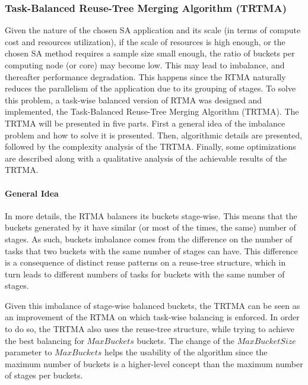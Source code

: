 



\subsubsection{Task-Balanced Reuse-Tree Merging Algorithm (TRTMA)}
\label{sec:TRTMA}

Given the nature of the chosen SA application and its scale (in terms of compute cost and resources utilization), if the scale of resources is high enough, or the chosen SA method requires a sample size small enough, the ratio of buckets per computing node (or core) may become low. This may lead to imbalance, and thereafter performance degradation. This happens since the RTMA naturally reduces the parallelism of the application due to its grouping of stages. To solve this problem, a task-wise balanced version of RTMA was designed and implemented, the Task-Balanced Reuse-Tree Merging Algorithm (TRTMA). The TRTMA will be presented in five parts. First a general idea of the imbalance problem and how to solve it is presented. Then, algorithmic details are presented, followed by the complexity analysis of the TRTMA. Finally, some optimizations are described along with a qualitative analysis of the achievable results of the TRTMA.

\paragraph{General Idea}

In more details, the RTMA balances its buckets stage-wise. This means that the buckets generated by it have similar (or most of the times, the same) number of stages. As such, buckets imbalance comes from the difference on the number of tasks that two buckets with the same number of stages can have. This difference is a consequence of distinct reuse patterns on a reuse-tree structure, which in turn leads to different numbers of tasks for buckets with the same number of stages.

Given this imbalance of stage-wise balanced buckets, the TRTMA can be seen as an improvement of the RTMA on which task-wise balancing is enforced. In order to do so, the TRTMA also uses the reuse-tree structure, while trying to achieve the best balancing for $MaxBuckets$ buckets. The change of the $MaxBucketSize$ parameter to $MaxBuckets$ helps the usability of the algorithm since the maximum number of buckets is a higher-level concept than the maximum number of stages per buckets.

